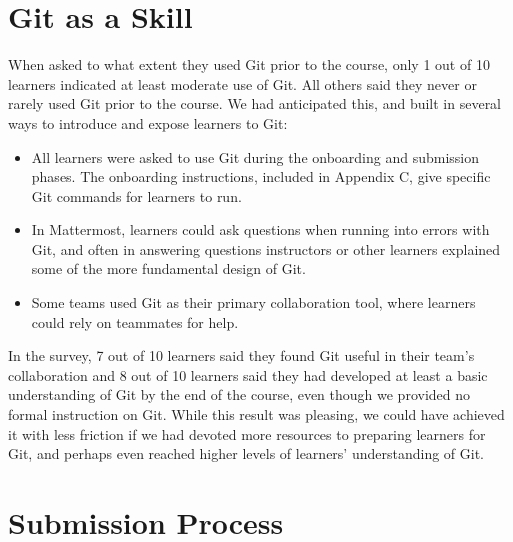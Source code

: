\documentclass[12pt,twoside]{mitthesis}
\newcommand{\review}[1]{{\color{mygreen} #1}}
\begin{document}
\section{Git as a Skill}

\review{When asked to what extent they used Git prior to the course, only 1 out of 10 learners indicated at least moderate use of Git. All others said they never or rarely used Git prior to the course. We had anticipated this, and built in several ways to introduce and expose learners to Git:
\begin{itemize}
\item All learners were asked to use Git during the onboarding and submission phases. The onboarding instructions, included in Appendix C, give specific Git commands for learners to run.
\item In Mattermost, learners could ask questions when running into errors with Git, and often in answering questions instructors or other learners explained some of the more fundamental design of Git.
\item Some teams used Git as their primary collaboration tool, where learners could rely on teammates for help.
\end{itemize}
In the survey, 7 out of 10 learners said they found Git useful in their team's collaboration and 8 out of 10 learners said they had developed at least a basic understanding of Git by the end of the course, even though we provided no formal instruction on Git. While this result was pleasing, we could have achieved it with less friction if we had devoted more resources to preparing learners for Git, and perhaps even reached higher levels of learners' understanding of Git.}

\section{Submission Process}
\end{document}
